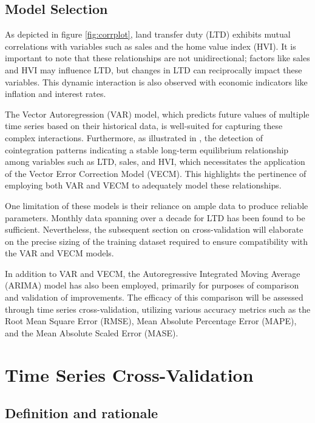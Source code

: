 \documentclass[11pt,a4paper,]{article}
\begin{document}
\subsection{Model Selection}\label{model-selection}

As depicted in figure \ref{fig:corrplot}, land transfer duty (LTD) exhibits mutual correlations with variables such as sales and the home value index (HVI). It is important to note that these relationships are not unidirectional; factors like sales and HVI may influence LTD, but changes in LTD can reciprocally impact these variables. This dynamic interaction is also observed with economic indicators like inflation and interest rates.

The Vector Autoregression (VAR) model, which predicts future values of multiple time series based on their historical data, is well-suited for capturing these complex interactions. Furthermore, as illustrated in \emph{}, the detection of cointegration patterns indicating a stable long-term equilibrium relationship among variables such as LTD, sales, and HVI, which necessitates the application of the Vector Error Correction Model (VECM). This highlights the pertinence of employing both VAR and VECM to adequately model these relationships.

One limitation of these models is their reliance on ample data to produce reliable parameters. Monthly data spanning over a decade for LTD has been found to be sufficient. Nevertheless, the subsequent section on cross-validation will elaborate on the precise sizing of the training dataset required to ensure compatibility with the VAR and VECM models.

In addition to VAR and VECM, the Autoregressive Integrated Moving Average (ARIMA) model has also been employed, primarily for purposes of comparison and validation of improvements. The efficacy of this comparison will be assessed through time series cross-validation, utilizing various accuracy metrics such as the Root Mean Square Error (RMSE), Mean Absolute Percentage Error (MAPE), and the Mean Absolute Scaled Error (MASE).

\section{Time Series Cross-Validation}\label{time-series-cross-validation}

\subsection{Definition and rationale}\label{definition-and-rationale}
\end{document}

